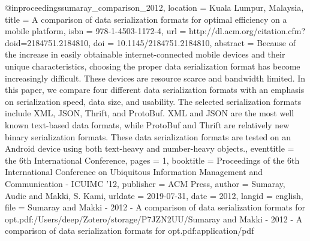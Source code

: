 
@inproceedings{sumaray_comparison_2012,
	location = {Kuala Lumpur, Malaysia},
	title = {A comparison of data serialization formats for optimal efficiency on a mobile platform},
	isbn = {978-1-4503-1172-4},
	url = {http://dl.acm.org/citation.cfm?doid=2184751.2184810},
	doi = {10.1145/2184751.2184810},
	abstract = {Because of the increase in easily obtainable internet-connected mobile devices and their unique characteristics, choosing the proper data serialization format has become increasingly difficult. These devices are resource scarce and bandwidth limited. In this paper, we compare four different data serialization formats with an emphasis on serialization speed, data size, and usability. The selected serialization formats include {XML}, {JSON}, Thrift, and {ProtoBuf}. {XML} and {JSON} are the most well known text-based data formats, while {ProtoBuf} and Thrift are relatively new binary serialization formats. These data serialization formats are tested on an Android device using both text-heavy and number-heavy objects.},
	eventtitle = {the 6th International Conference},
	pages = {1},
	booktitle = {Proceedings of the 6th International Conference on Ubiquitous Information Management and Communication - {ICUIMC} '12},
	publisher = {{ACM} Press},
	author = {Sumaray, Audie and Makki, S. Kami},
	urldate = {2019-07-31},
	date = {2012},
	langid = {english},
	file = {Sumaray and Makki - 2012 - A comparison of data serialization formats for opt.pdf:/Users/deep/Zotero/storage/P7JZN2UU/Sumaray and Makki - 2012 - A comparison of data serialization formats for opt.pdf:application/pdf}
}